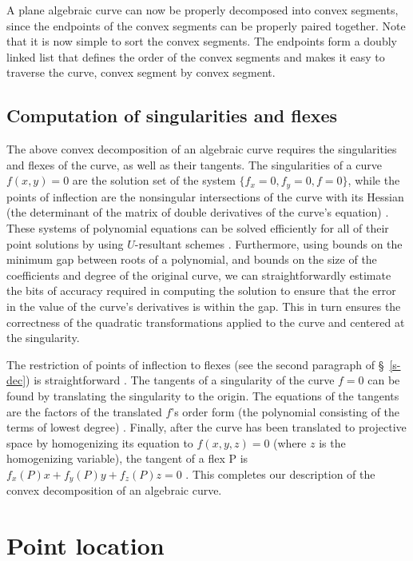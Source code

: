 A plane algebraic curve can now be properly decomposed into convex segments,
since the endpoints of the convex segments can be properly paired together.
Note that it is now simple to sort the convex segments.
The endpoints form a doubly linked list
that defines the order of the convex segments
and makes it easy to traverse the curve, convex segment by convex segment.

\subsection{Computation of singularities and flexes}
\label{ssc}

The above convex decomposition of an algebraic curve requires the 
singularities 
and flexes of the curve, as well as their tangents.
The singularities of a curve $f(x,y)=0$ are the solution set of the system
$\{f_{x}=0,f_{y}=0,f=0\}$, while the points of inflection are the 
nonsingular 
intersections of the curve with its Hessian (the determinant 
of the matrix of double derivatives of the curve's equation) \cite{walker}.
%
These systems of polynomial equations can be solved efficiently 
for all of their point solutions by using $U$-resultant schemes \cite{Ca}. 
Furthermore, using bounds on the minimum gap between roots of a polynomial, 
and bounds on the
size of the coefficients and degree of the original curve, we 
can straightforwardly
estimate the bits of accuracy required in computing the solution 
to ensure that the error in the value of the curve's derivatives is within 
the gap. 
This in turn ensures the correctness of the quadratic transformations 
applied to the 
curve and centered at the singularity.

The restriction of points of inflection to flexes (see the 
second paragraph of \S~\ref{s-dec})
is straightforward \cite[p. 44]{jj}.
The tangents of a singularity of the curve $f=0$ can be found by 
translating 
the singularity to the origin.
The equations of the tangents are the factors of the translated $f$'s order
form (the polynomial consisting of the terms of lowest degree) 
\cite{walker}.
Finally, after the curve has been translated to projective space by 
homogenizing 
its equation to $f(x,y,z)=0$ (where $z$ is the homogenizing variable),
the tangent of a flex P is $f_{x}(P)x + f_{y}(P)y + f_{z}(P)z= 0$ 
\cite{walker}.
This completes our description of the convex decomposition of an algebraic 
curve.

\section{Point location}
\label{s-loc}

